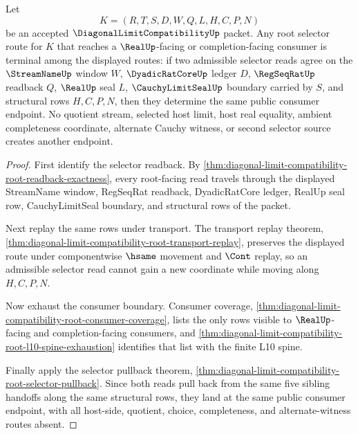 \begin{theorem}
\label{thm:diagonal-limit-compatibility-root-selector-terminality}
Let
$$
K=(R,T,S,D,W,Q,L,H,C,P,N)
$$
be an accepted $\DiagonalLimitCompatibilityUp$ packet. Any root selector route
for $K$ that reaches a $\RealUp$-facing or completion-facing consumer is
terminal among the displayed routes: if two admissible selector reads agree on
the $\StreamNameUp$ window $W$, $\DyadicRatCoreUp$ ledger $D$, $\RegSeqRatUp$
readback $Q$, $\RealUp$ seal $L$, $\CauchyLimitSealUp$ boundary carried by
$S$, and structural rows $H,C,P,N$, then they determine the same public
consumer endpoint. No quotient stream, selected host limit, host real equality,
ambient completeness coordinate, alternate Cauchy witness, or second selector
source creates another endpoint.
\end{theorem}
\begin{proof}
First identify the selector readback. By
\autoref{thm:diagonal-limit-compatibility-root-readback-exactness}, every
root-facing read travels through the displayed StreamName window, RegSeqRat
readback, DyadicRatCore ledger, RealUp seal row, CauchyLimitSeal boundary, and
structural rows of the packet.

Next replay the same rows under transport. The transport replay theorem,
\autoref{thm:diagonal-limit-compatibility-root-transport-replay}, preserves
the displayed route under componentwise $\hsame$ movement and $\Cont$ replay,
so an admissible selector read cannot gain a new coordinate while moving along
$H,C,P,N$.

Now exhaust the consumer boundary. Consumer coverage,
\autoref{thm:diagonal-limit-compatibility-root-consumer-coverage}, lists the
only rows visible to $\RealUp$-facing and completion-facing consumers, and
\autoref{thm:diagonal-limit-compatibility-root-l10-spine-exhaustion} identifies
that list with the finite L10 spine.

Finally apply the selector pullback theorem,
\autoref{thm:diagonal-limit-compatibility-root-selector-pullback}. Since both
reads pull back from the same five sibling handoffs along the same structural
rows, they land at the same public consumer endpoint, with all host-side,
quotient, choice, completeness, and alternate-witness routes absent.
\end{proof}

